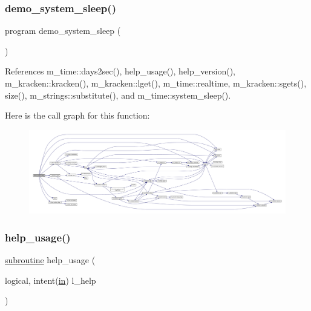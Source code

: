 \subsubsection{\texorpdfstring{demo\+\_\+system\+\_\+sleep()}{demo\_system\_sleep()}}
{\footnotesize\ttfamily program demo\+\_\+system\+\_\+sleep (\begin{DoxyParamCaption}{ }\end{DoxyParamCaption})}



References m\+\_\+time\+::days2sec(), help\+\_\+usage(), help\+\_\+version(), m\+\_\+kracken\+::kracken(), m\+\_\+kracken\+::lget(), m\+\_\+time\+::realtime, m\+\_\+kracken\+::sgets(), size(), m\+\_\+strings\+::substitute(), and m\+\_\+time\+::system\+\_\+sleep().

Here is the call graph for this function\+:
\nopagebreak
\begin{figure}[H]
\begin{center}
\leavevmode
\includegraphics[width=350pt]{__sleep_8f90_adea2b9826964203f987d029f48afa37a_cgraph}
\end{center}
\end{figure}
\mbox{\label{__sleep_8f90_a3e09a3b52ee8fb04eeb93fe5761626a8}} 
\subsubsection{\texorpdfstring{help\+\_\+usage()}{help\_usage()}}
{\footnotesize\ttfamily \hyperlink{M__stopwatch_83_8txt_acfbcff50169d691ff02d4a123ed70482}{subroutine} help\+\_\+usage (\begin{DoxyParamCaption}\item[{logical, intent(\hyperlink{M__journal_83_8txt_afce72651d1eed785a2132bee863b2f38}{in})}]{l\+\_\+help }\end{DoxyParamCaption})}



